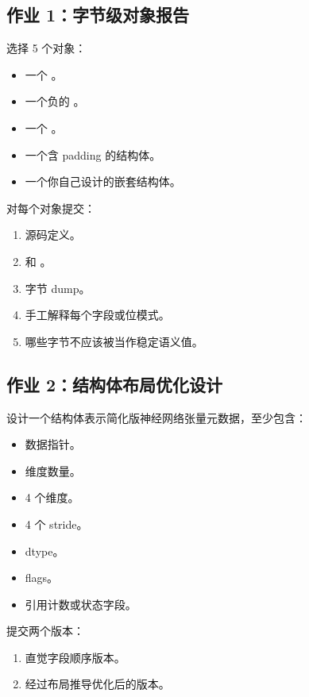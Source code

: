 \begin{exercisebox}
\subsection*{作业 1：字节级对象报告}

选择 5 个对象：

\begin{itemize}
  \item 一个 。
  \item 一个负的 。
  \item 一个 。
  \item 一个含 padding 的结构体。
  \item 一个你自己设计的嵌套结构体。
\end{itemize}

对每个对象提交：

\begin{enumerate}
  \item 源码定义。
  \item {} 和 。
  \item 字节 dump。
  \item 手工解释每个字段或位模式。
  \item 哪些字节不应该被当作稳定语义值。
\end{enumerate}

\subsection*{作业 2：结构体布局优化设计}

设计一个结构体表示简化版神经网络张量元数据，至少包含：

\begin{itemize}
  \item 数据指针。
  \item 维度数量。
  \item 4 个维度。
  \item 4 个 stride。
  \item dtype。
  \item flags。
  \item 引用计数或状态字段。
\end{itemize}

提交两个版本：

\begin{enumerate}
  \item 直觉字段顺序版本。
  \item 经过布局推导优化后的版本。
\end{enumerate}


\end{exercisebox}
